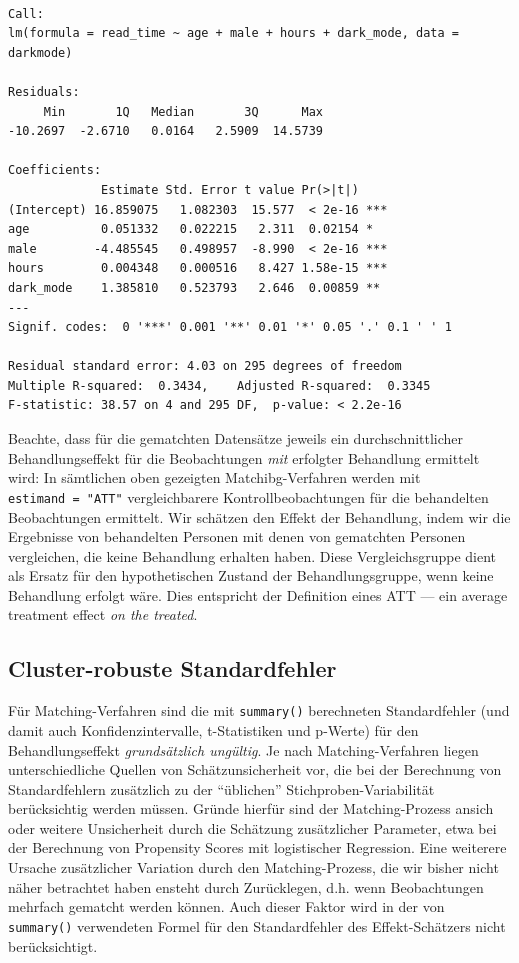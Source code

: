 \documentclass[
  a4paper,
  DIV=11,
  oneside]{scrreprt}
\begin{document}
\begin{verbatim}

Call:
lm(formula = read_time ~ age + male + hours + dark_mode, data = darkmode)

Residuals:
     Min       1Q   Median       3Q      Max 
-10.2697  -2.6710   0.0164   2.5909  14.5739 

Coefficients:
             Estimate Std. Error t value Pr(>|t|)    
(Intercept) 16.859075   1.082303  15.577  < 2e-16 ***
age          0.051332   0.022215   2.311  0.02154 *  
male        -4.485545   0.498957  -8.990  < 2e-16 ***
hours        0.004348   0.000516   8.427 1.58e-15 ***
dark_mode    1.385810   0.523793   2.646  0.00859 ** 
---
Signif. codes:  0 '***' 0.001 '**' 0.01 '*' 0.05 '.' 0.1 ' ' 1

Residual standard error: 4.03 on 295 degrees of freedom
Multiple R-squared:  0.3434,    Adjusted R-squared:  0.3345 
F-statistic: 38.57 on 4 and 295 DF,  p-value: < 2.2e-16
\end{verbatim}

Beachte, dass für die gematchten Datensätze jeweils ein
durchschnittlicher Behandlungseffekt für die Beobachtungen \emph{mit}
erfolgter Behandlung ermittelt wird: In sämtlichen oben gezeigten
Matchibg-Verfahren werden mit \texttt{estimand\ =\ "ATT"}
vergleichbarere Kontrollbeobachtungen für die behandelten Beobachtungen
ermittelt. Wir schätzen den Effekt der Behandlung, indem wir die
Ergebnisse von behandelten Personen mit denen von gematchten Personen
vergleichen, die keine Behandlung erhalten haben. Diese Vergleichsgruppe
dient als Ersatz für den hypothetischen Zustand der Behandlungsgruppe,
wenn keine Behandlung erfolgt wäre. Dies entspricht der Definition eines
ATT --- ein average treatment effect \emph{on the treated}.

\subsection{Cluster-robuste
Standardfehler}\label{cluster-robuste-standardfehler}

Für Matching-Verfahren sind die mit \texttt{summary()} berechneten
Standardfehler (und damit auch Konfidenzintervalle, t-Statistiken und
p-Werte) für den Behandlungseffekt \emph{grundsätzlich ungültig}. Je
nach Matching-Verfahren liegen unterschiedliche Quellen von
Schätzunsicherheit vor, die bei der Berechnung von Standardfehlern
zusätzlich zu der ``üblichen'' Stichproben-Variabilität berücksichtig
werden müssen. Gründe hierfür sind der Matching-Prozess ansich oder
weitere Unsicherheit durch die Schätzung zusätzlicher Parameter, etwa
bei der Berechnung von Propensity Scores mit logistischer Regression.
Eine weiterere Ursache zusätzlicher Variation durch den
Matching-Prozess, die wir bisher nicht näher betrachtet haben ensteht
durch Zurücklegen, d.h. wenn Beobachtungen mehrfach gematcht werden
können. Auch dieser Faktor wird in der von \texttt{summary()}
verwendeten Formel für den Standardfehler des Effekt-Schätzers nicht
berücksichtigt.
\end{document}
